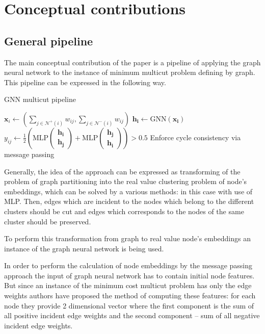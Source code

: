 \documentclass[10pt, twocolumn, a4paper]{article}
\theoremstyle{definition}
\begin{document}
\section{Conceptual contributions}

\subsection{General pipeline}

The main conceptual contribution of the paper is a pipeline of applying the graph neural network to
the instance of minimum multicut problem defining by graph. This pipeline can be expressed in the following way.

\begin{algorithm}[h]
    \caption{GNN multicut pipeline}\label{alg:pipeline}

    {
        $
            \mathbf{x}_i \gets \left(
            \sum\limits_{j \in \mathcal{N}^{+}(i)} w_{ij},
            \sum\limits_{j \in \mathcal{N}^{-}(i)} w_{ij}
            \right)
        $ \;
        $\mathbf{h_i} \gets \text{GNN}(\mathbf{x_i})$ \;
    }
    {
        $y_{ij} \gets \frac{1}{2} \left( \text{MLP} \left( \substack{\mathbf{h_i} \\ \mathbf{h_j}} \right) +
            \text{MLP} \left( \substack{\mathbf{h_j} \\ \mathbf{h_i}} \right) \right) > 0.5$ \;
    }
    Enforce cycle consistency via message passing
\end{algorithm}

Generally, the idea of the approach can be expressed as transforming of the problem of graph partitioning into the real
value clustering problem of node's embeddings, which can be solved by a various methods: in this case with use of MLP.
Then, edges which are incident to the nodes which belong to the different clusters should be cut and
edges which corresponds to the nodes of the same cluster should be preserved.

To perform this transformation from graph to real value node's embeddings an instance of the graph neural
network is being used.

In order to perform the calculation of node embeddings by the message passing approach the input of
graph neural network has to contain initial node features. But since an instance of the minimum cost multicut problem
has only the edge weights authors have proposed the method of computing these features: for each node
they provide 2 dimensional vector where the first component is the sum of all positive incident edge weights and
the second component -- sum of all negative incident edge weights.
\end{document}
